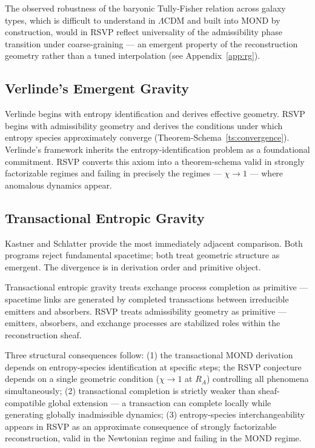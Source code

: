 \documentclass[11pt, a4paper]{article}
\theoremstyle{plain}
\theoremstyle{definition}
\theoremstyle{remark}
\newcommand{\RA}{R_{\!A}}
\begin{document}
The observed robustness of the baryonic Tully-Fisher relation \cite{mcgaugh2011}
across galaxy types, which is difficult to understand in $\Lambda$CDM and built into
MOND by construction, would in RSVP reflect universality of the admissibility phase
transition under coarse-graining --- an emergent property of the reconstruction
geometry rather than a tuned interpolation (see Appendix~\ref{app:rg}).

\subsection{Verlinde's Emergent Gravity}

Verlinde \cite{verlinde2011,verlinde2017} begins with entropy identification and
derives effective geometry. RSVP begins with admissibility geometry and derives the
conditions under which entropy species approximately converge
(Theorem-Schema~\ref{ts:convergence}). Verlinde's framework inherits the
entropy-identification problem \cite{jaynes1957} as a foundational commitment. RSVP
converts this axiom into a theorem-schema valid in strongly factorizable regimes and
failing in precisely the regimes --- $\chi \to 1$ --- where anomalous dynamics appear.

\subsection{Transactional Entropic Gravity}

Kastner and Schlatter \cite{kastner2024} provide the most immediately adjacent
comparison. Both programs reject fundamental spacetime; both treat geometric structure
as emergent. The divergence is in derivation order and primitive object.

Transactional entropic gravity treats exchange process completion as primitive ---
spacetime links are generated by completed transactions between irreducible emitters
and absorbers. RSVP treats admissibility geometry as primitive --- emitters,
absorbers, and exchange processes are stabilized roles within the reconstruction
sheaf.

Three structural consequences follow: (1) the transactional MOND derivation depends
on entropy-species identification at specific steps; the RSVP conjecture depends on a
single geometric condition ($\chi \to 1$ at $\RA$) controlling all phenomena
simultaneously; (2) transactional completion is strictly weaker than sheaf-compatible
global extension --- a transaction can complete locally while generating globally
inadmissible dynamics; (3) entropy-species interchangeability appears in RSVP as an
approximate consequence of strongly factorizable reconstruction, valid in the
Newtonian regime and failing in the MOND regime.
\end{document}
